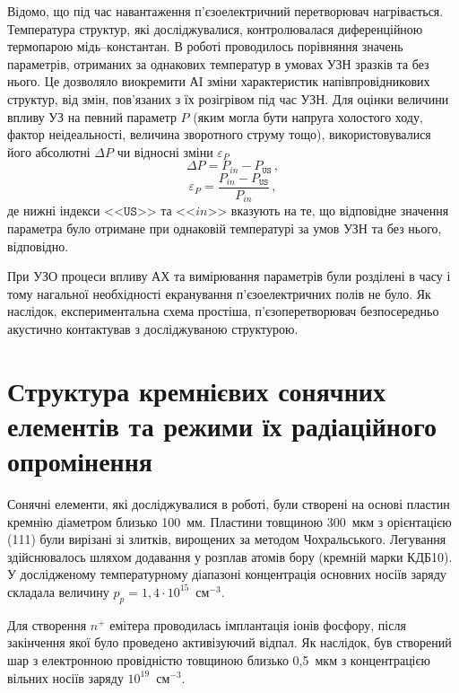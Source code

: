 Відомо, що під час навантаження п'єзоелектричний перетворювач нагрівається.
Температура структур, які досліджувалися, контролювалася диференційною термопарою мідь--константан.
В роботі проводилось порівняння значень параметрів, отриманих за однакових температур в умовах УЗН зразків та без нього.
Це дозволяло виокремити АІ зміни характеристик напівпровідникових структур, від змін, пов'язаних з їх розігрівом під час УЗН.
Для оцінки величини впливу УЗ на певний параметр $P$ (яким могла бути напруга холостого ходу, фактор неідеальності, величина зворотного струму тощо),
використовувалися його абсолютні
$\Delta P$ чи відносні зміни $\varepsilon_P$
 \begin{equation}
 \label{eqAbsDelta}
\Delta P=P_{in}-P_\mathtt{US}\,,
 \end{equation}
 \begin{equation}
 \label{eqEpsDelta}
\varepsilon_P=\frac{P_{in}-P_\mathtt{US}}{P_{in}}\,,
 \end{equation}
де нижні індекси <<$\mathtt{US}$>> та <<$in$>> вказують на те, що відповідне значення параметра було отримане при однаковій температурі за умов УЗН та без нього, відповідно.

При УЗО процеси впливу АХ та вимірювання параметрів були розділені в часу і тому нагальної необхідності екранування п'єзоелектричних полів не було.
Як наслідок, експериментальна схема простіша, п'єзоперетворювач безпосередньо акустично контактував з досліджуваною структурою.




\section{Структура кремнієвих сонячних елементів та режими їх радіаційного опромінення\label{SSC}}
Сонячні елементи, які досліджувалися в роботі, були створені на основі пластин кремнію діаметром близько 100~мм.
Пластини  товщиною 300~мкм з орієнтацією (111) були вирізані зі злитків, вирощених за методом Чохральського.
Легування здійснювалось шляхом додавання у розплав атомів бору (кремній марки КДБ10).
У дослідженому температурному діапазоні концентрація основних носіїв заряду складала величину $p_p=1,4\cdot10^{15}$~см$^{-3}$.

Для створення $n^+$ емітера проводилась імплантація іонів фосфору, після закінчення якої було проведено активізуючий відпал.
Як наслідок, був створений шар з електронною провідністю товщиною близько  0,5~мкм з концентрацією вільних носіїв заряду $10^{19}$~см$^{-3}$.


